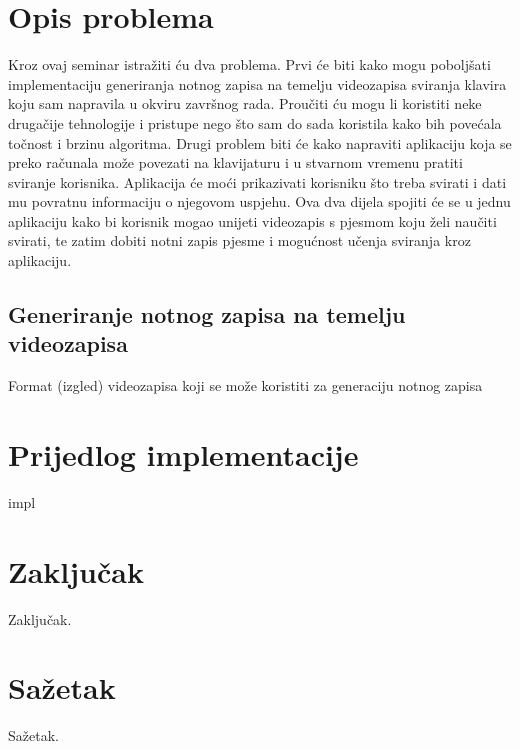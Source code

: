 \documentclass[times, utf8, seminar]{fer}
\begin{document}
\chapter{Opis problema}
Kroz ovaj seminar istražiti ću dva problema. Prvi će biti kako mogu poboljšati implementaciju generiranja notnog zapisa na temelju videozapisa sviranja klavira koju sam napravila u okviru završnog rada. Proučiti ću mogu li koristiti neke drugačije tehnologije i pristupe nego što sam do sada koristila kako bih povećala točnost i brzinu algoritma. Drugi problem biti će kako napraviti aplikaciju koja se preko računala može povezati na klavijaturu i u stvarnom vremenu pratiti sviranje korisnika. Aplikacija će moći prikazivati korisniku što treba svirati i dati mu povratnu informaciju o njegovom uspjehu. Ova dva dijela spojiti će se u jednu aplikaciju kako bi korisnik mogao unijeti videozapis s pjesmom koju želi naučiti svirati, te zatim dobiti notni zapis pjesme i mogućnost učenja sviranja kroz aplikaciju.

\section{Generiranje notnog zapisa na temelju videozapisa}
Format (izgled) videozapisa koji se može koristiti za generaciju notnog zapisa

\chapter{Prijedlog implementacije}
impl

\chapter{Zaključak}
Zaključak.




\chapter{Sažetak}
Sažetak.
\end{document}
